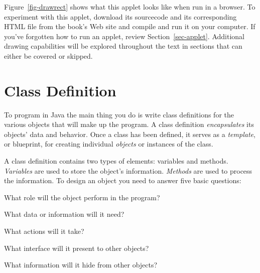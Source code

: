 Figure~\ref{fig-drawrect} shows what this applet looks like when run
in a browser.  To experiment with this applet, download its sourcecode
and its corresponding HTML file from the book's Web site and compile
and run it on your computer. If you've forgotten how to run an applet,
review Section~\ref{sec-applet}. Additional drawing capabilities will
be explored throughout the text in sections that can either be covered
or skipped.

\begin{figure}[!bht]
\figaleftscaled{chptr02/drawrect.eps}{0.8}{This is how the {\tt HelloWorldGraphic}
applet will look when run in a browser.
\label{fig-drawrect}
\label{pg-fig-drawrect}}
\end{figure}

\section{Class Definition}
\label{sec-classdef}
\label{pg-sec-classdef}
\noindent To program in Java the main thing you do is write class definitions
for the various objects that will make up the program.  A class
definition {\it encapsulates} its objects' data and behavior.  Once a
class has been defined, it serves as a {\it template}, or blueprint,
for creating individual {\it objects} or instances of the class.

A class definition contains two types of elements: variables and
methods.  {\it Variables} are used to store the
object's information.  {\it Methods} are used to process the
information.  To design an object you need to answer five basic
questions:

\begin{minipage}[t]{26pc}
\begin{NL}
\item  What role will the object perform in the program?
\item  What data or information will it need?
\item  What actions will it take?
\item  What interface will it present to other objects?
\item  What information will it hide from other objects?
\end{NL}
\end{minipage}


